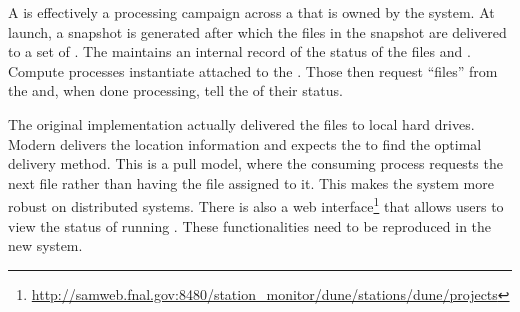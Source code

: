\documentclass[../main-v1.tex]{subfiles}
\begin{document}
A  is effectively a processing campaign across a  that is owned by the  system. At launch, a snapshot is generated after which the files in the snapshot are delivered to a set of .  The  maintains an internal record of the status of the files and . Compute processes instantiate  attached to the .  Those  then request ``files'' from the  and, when done processing, tell the  of their status.  

The original  implementation actually delivered the files to local hard drives.  Modern  delivers the location information and expects the  to find the optimal delivery method. This is a pull model, where the consuming process requests the next file rather than having the file assigned to it.  This makes the system more robust on distributed systems. 
There is also a web interface\footnote{\href{http://samweb.fnal.gov:8480/station_monitor/dune/stations/dune/projects}{http://samweb.fnal.gov:8480/station\_monitor/dune/stations/dune/projects}} that allows users to view the status of running . 
These functionalities need to be reproduced in the new system.






\end{document}
